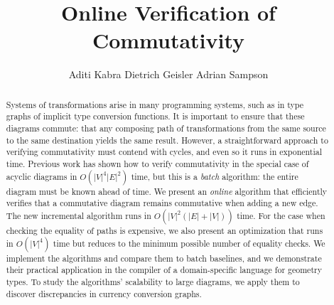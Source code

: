 \documentclass[sigplan,review]{acmart}
\begin{document}
\title{Online Verification of Commutativity}
%
%
\author{Aditi Kabra \quad Dietrich Geisler \quad Adrian Sampson}
\acmDOI{} %

\begin{abstract}
Systems of transformations arise in many programming systems, such as in type graphs of implicit type conversion functions.
It is important to ensure that these diagrams commute: that any composing path of transformations from the same source to the same destination yields the same result.
However, a straightforward approach to verifying commutativity must contend with cycles, and even so it runs in exponential time.
Previous work has shown how to verify commutativity in the special case of acyclic diagrams in $O(|V|^4|E|^2)$ time,
but this is a \emph{batch} algorithm: the entire diagram must be known ahead of time.
We present an \emph{online} algorithm that efficiently verifies that a commutative diagram remains commutative when adding a new edge.
The new incremental algorithm runs in $O(|V|^2(|E| + |V|))$ time.
For the case when checking the equality of paths is expensive, we also present an optimization that runs in $O(|V|^4)$ time but reduces to the minimum possible number of equality checks.
We implement the algorithms and compare them to batch baselines, and we demonstrate their practical application in the compiler of a domain-specific language for geometry types.
To study the algorithms' scalability to large diagrams, we apply them to discover discrepancies in currency conversion graphs.
\end{abstract}

\maketitle
\end{document}
